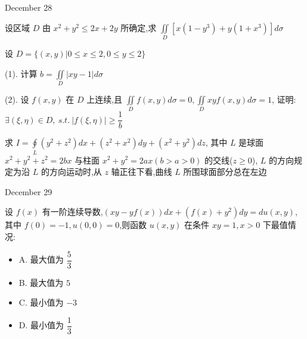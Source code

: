 \begin{solution}
	
\end{solution}


\textcolor{purplea}{December 28}

\begin{example}[][Exam: 38.4.13]
	设区域 $D$ 由 $x^{2}+y^{2}\leq 2x+2y$ 所确定,求 $\displaystyle{\iint\limits_{D}[x(1-y^{3})+y(1+x^{3})]d\sigma}$
\end{example}

\begin{solution}
	
\end{solution}

\begin{example}[][Exam: 38.4.14]
	设 $D=\{(x,y)|0\leq x\leq 2,0\leq y\leq 2\}$

(1). 计算 $\displaystyle{b=\iint\limits_{D}|xy-1|d\sigma}$

(2). 设 $f(x,y)$ 在 $D$ 上连续,且 $\displaystyle{\iint\limits_{D}f(x,y)d\sigma=0,\iint\limits_{D}xyf(x,y)d\sigma=1}$,
证明: $\exists (\xi,\eta)\in D,\ s.t.\ |f(\xi,\eta)|\geq \dfrac{1}{b}$
\end{example}

\begin{solution}
	
\end{solution}

\begin{example}[][Exam: 38.4.15]
	求 $\displaystyle{I=\oint\limits_{L}(y^{2}+z^{2})dx+(z^{2}+x^{2})dy+(x^{2}+y^{2})dz}$, 
	其中 $L$ 是球面 $x^{2}+y^{2}+z^{2}=2bx$ 与柱面 $x^{2}+y^{2}=2ax(b>a>0)$ 的交线($z\geq 0$),
	$L$ 的方向规定为沿 $L$ 的方向运动时,从 $z$ 轴正往下看,曲线 $L$ 所围球面部分总在左边
\end{example}

\begin{solution}
	
\end{solution}


\textcolor{purplea}{December 29}

\begin{example}[][Exam: 38.4.16]
	设 $f(x)$ 有一阶连续导数,$(xy-yf(x))dx+(f(x)+y^{2})dy=du(x,y)$,其中 $f(0)=-1,u(0,0)=0$,则函数 $u(x,y)$ 在条件 $xy=1,x>0$ 下最值情况:
\begin{itemize}
	\item A. 最大值为 $\dfrac{5}{3}$
	\item B. 最大值为 $5$
	\item C. 最小值为 $-3$
	\item D. 最小值为 $\dfrac{1}{3}$
\end{itemize}
\end{example}

